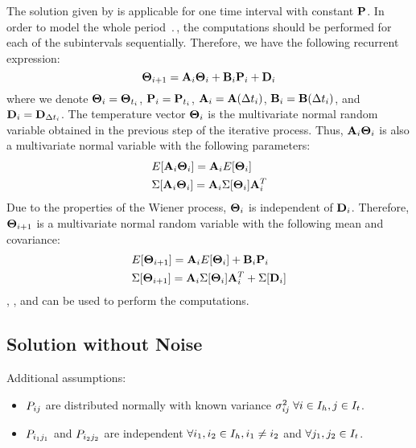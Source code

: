 The solution given by  is applicable for one time interval with constant $\mathbf{P}$. In order to model the whole period $\period$, the computations should be performed for each of the subintervals sequentially. Therefore, we have the following recurrent expression:
\begin{equation} \equlabel{recurrence}
  \vtemperature_{i + 1} = \m{A}_i \vtemperature_i + \m{B}_i \vpower_i + \m{D}_i
\end{equation}
where we denote $\mathbf{\Theta}_i = \mathbf{\Theta}_{t_i}$, $\mathbf{P}_i = \mathbf{P}_{t_i}$, $\mathbf{A}_i = \mathbf{A}(\Delta t_i)$, $\mathbf{B}_i = \mathbf{B}(\Delta t_i)$, and $\mathbf{D}_i = \mathbf{D}_{\Delta t_i}$. The temperature vector $\mathbf{\Theta}_i$ is the multivariate normal random variable obtained in the previous step of the iterative process. Thus, $\mathbf{A}_i \mathbf{\Theta}_i$ is also a multivariate normal variable with the following parameters:
\begin{align*}
  & E[\mathbf{A}_i \mathbf{\Theta}_i] = \mathbf{A}_i E[\mathbf{\Theta}_i] \\
  & \Sigma[\mathbf{A}_i \mathbf{\Theta}_i] = \mathbf{A}_i \Sigma[\mathbf{\Theta}_i] \mathbf{A}^T_i
\end{align*}
Due to the properties of the Wiener process, $\mathbf{\Theta}_i$ is independent of $\mathbf{D}_i$. Therefore, $\mathbf{\Theta}_{i+1}$ is a multivariate normal random variable with the following mean and covariance:
\begin{align*}
  & E[\mathbf{\Theta}_{i+1}] = \mathbf{A}_i E[\mathbf{\Theta}_i] + \mathbf{B}_i \mathbf{P}_i \\
  & \Sigma[\mathbf{\Theta}_{i+1}] = \mathbf{A}_i \Sigma[\mathbf{\Theta}_i] \mathbf{A}^T_i + \Sigma[\mathbf{D}_i]
\end{align*}
, , and  can be used to perform the computations.

\subsection{Solution without Noise}
Additional assumptions:
\begin{itemize}
  \item $P_{ij}$ are distributed normally with known variance $\sigma_{ij}^2 \; \forall i \in I_h, j \in I_t$.
  \item $P_{i_1 j_1}$ and $P_{i_2 j_2}$ are independent $\forall i_1, i_2 \in I_h,  i_1 \neq i_2$ and $\forall j_1, j_2 \in I_t$.
\end{itemize}

